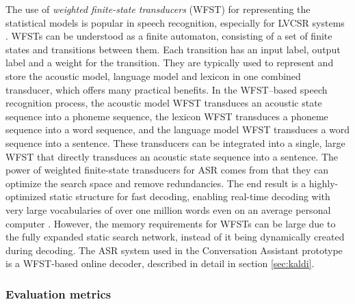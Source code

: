 \documentclass[english, 12pt, a4paper, pdftex, elec, utf8]{aaltothesis}
\begin{document}
The use of \textit{weighted finite-state transducers} (WFST) for representing the statistical models is popular in speech recognition, especially for LVCSR systems \cite{hori2013speech, mohri2008speech, smit17boundaries}. WFSTs can be understood as a finite automaton, consisting of a set of finite states and transitions between them. Each transition has an input label, output label and a weight for the transition. They are typically used to represent and store the acoustic model, language model and lexicon in one combined transducer, which offers many practical benefits. In the WFST--based speech recognition process, the acoustic model WFST transduces an acoustic state sequence into a phoneme sequence, the lexicon WFST transduces a phoneme sequence into a word sequence, and the language model WFST transduces a word sequence into a sentence. These transducers can be integrated into a single, large WFST that directly transduces an acoustic state sequence into a sentence. The power of weighted finite-state transducers for ASR comes from that they can optimize the search space and remove redundancies. The end result is a highly-optimized static structure for fast decoding, enabling real-time decoding with very large vocabularies of over one million words even on an average personal computer \cite[p.~4--6]{hori2013speech}. However, the memory requirements for WFSTs can be large due to the fully expanded static search network, instead of it being dynamically created during decoding. The ASR system used in the Conversation Assistant prototype is a WFST-based online decoder, described in detail in section \ref{sec:kaldi}.

\subsubsection{Evaluation metrics}
\end{document}
